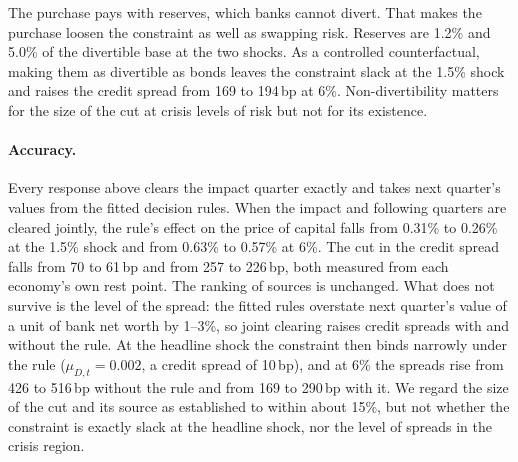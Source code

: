 The purchase pays with reserves, which banks cannot divert. That makes the purchase loosen the
constraint as well as swapping risk. Reserves are 1.2\% and 5.0\% of the divertible base at
the two shocks. As a controlled counterfactual, making them as divertible as bonds leaves the
constraint slack at the 1.5\% shock and raises the credit spread from 169 to 194\,bp at 6\%.
Non-divertibility matters for the size of the cut at crisis levels of risk but not for its
existence.

\paragraph{Accuracy.}
Every response above clears the impact quarter exactly and takes next quarter's values from
the fitted decision rules. When the impact and following quarters are cleared jointly, the
rule's effect on the price of capital falls from 0.31\% to 0.26\% at the 1.5\% shock and from
0.63\% to 0.57\% at 6\%. The cut in the credit spread falls from 70 to 61\,bp and from 257 to
226\,bp, both measured from each economy's own rest point. The ranking of sources is
unchanged. What does not survive is the level of the spread: the fitted rules overstate next
quarter's value of a unit of bank net worth by 1--3\%, so joint clearing raises credit spreads
with and without the rule. At the headline shock the constraint then binds narrowly under the
rule ($\mu_{D,t}=0.002$, a credit spread of 10\,bp), and at 6\% the spreads rise from 426 to
516\,bp without the rule and from 169 to 290\,bp with it. We regard the size of the cut and its
source as established to within about 15\%, but not whether the constraint is exactly slack at
the headline shock, nor the level of spreads in the crisis region.

